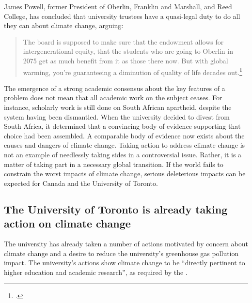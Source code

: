 


James Powell, former President of Oberlin, Franklin and Marshall, and Reed College, has concluded that university trustees have a quasi-legal duty to do all they can about climate change, arguing:
\begin{quotation}
The board is supposed to make sure that the endowment allows for intergenerational equity, that the students who are going to Oberlin in 2075 get as much benefit from it as those there now. But with global warming, you’re guaranteeing a diminution of quality of life decades out.\footcite[][]{CaseForDivestment}
\end{quotation}
The emergence of a strong academic consensus about the key features of a problem does not mean that all academic work on the subject ceases.
For instance, scholarly work is still done on South African apartheid, despite the system having been dismantled.
When the university decided to divest from South Africa, it determined that a convincing body of evidence supporting that choice had been assembled.
A comparable body of evidence now exists about the causes and dangers of climate change.
Taking action to address climate change is not an example of needlessly taking sides in a controversial issue. Rather, it is a matter of taking part in a necessary global transition. 
If the world fails to constrain the worst impacts of climate change, serious deleterious impacts can be expected for Canada and the University of Toronto.



	\subsection{The University of Toronto is already taking action on climate change}
	\label{UTTakenSides}



The university has already taken a number of actions motivated by concern about climate change and a desire to reduce the university's greenhouse gas pollution impact.
The university's actions show climate change to be ``directly pertinent to higher education and academic research'', as required by the .



